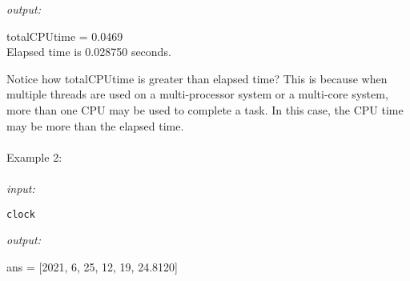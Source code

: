 \documentclass[../MATLAB_Primer.tex]{subfiles}
\begin{document}
\textit{output:}

\begin{center}
    totalCPUtime = 0.0469 \\ Elapsed time is 0.028750 seconds.
\end{center}

Notice how totalCPUtime is greater than elapsed time? This is because when multiple threads are used on a multi-processor system or a multi-core system, more than one CPU may be used to complete a task. In this case, the CPU time may be more than the elapsed time.
\\ \\
Example 2:
\\ \\
\textit{input:}
\begin{lstlisting}[frame=single]
clock
\end{lstlisting}

\textit{output:}

\begin{center}
    ans = [2021, 6, 25, 12, 19, 24.8120]
\end{center}
\end{document}
